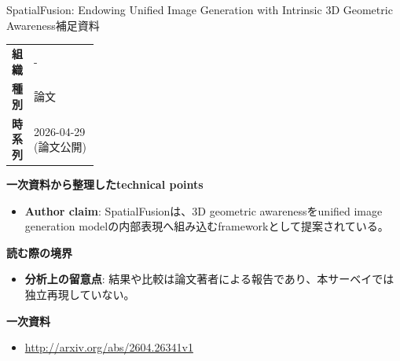 \begin{technicalnote}{SpatialFusion: Endowing Unified Image Generation with Intrinsic 3D Geometric Awareness}{補足資料}
\begingroup
\begin{tabularx}{\linewidth}{@{}>{\bfseries}p{0.22\linewidth}X@{}}
組織 & - \\
種別 & 論文 \\
時系列 & 2026-04-29 (論文公開) \\
\end{tabularx}
\smallskip
{\bfseries 一次資料から整理したtechnical points}
\begin{itemize}[leftmargin=1.5em,itemsep=0.35em]
\item \textbf{Author claim}: SpatialFusionは、3D geometric awarenessをunified image generation modelの内部表現へ組み込むframeworkとして提案されている。
\end{itemize}
\begin{minipage}{\linewidth}
{\bfseries 読む際の境界}
\begin{itemize}[leftmargin=1.5em,itemsep=0.35em]
\item \textbf{分析上の留意点}: 結果や比較は論文著者による報告であり、本サーベイでは独立再現していない。
\end{itemize}
\begin{samepage}
{\bfseries 一次資料}
\begingroup\sloppy
\begin{itemize}[leftmargin=1.5em,itemsep=0.25em]
\item {\scriptsize\url{http://arxiv.org/abs/2604.26341v1}}
\end{itemize}
\endgroup
\end{samepage}
\end{minipage}
\endgroup
\end{technicalnote}
\medskip

